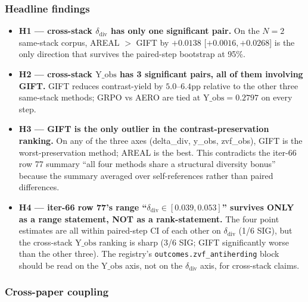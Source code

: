 \subsubsection{Headline findings}

\begin{itemize}
\item \textbf{H1 --- cross-stack $\delta_{\mathrm{div}}$ has only one
      significant pair.} On the $N\!=\!2$ same-stack corpus,
      AREAL $>$ GIFT by $+0.0138$ [$+0.0016,+0.0268$] is the only
      direction that survives the paired-step bootstrap at 95\%.
\item \textbf{H2 --- cross-stack $\mathrm{Y\_obs}$ has 3 significant pairs,
      all of them involving GIFT.} GIFT reduces contrast-yield
      by $5.0$--$6.4$pp relative to the other three same-stack methods;
      GRPO vs AERO are tied at $\mathrm{Y\_obs}=0.2797$ on every step.
\item \textbf{H3 --- GIFT is the only outlier in the contrast-preservation
      ranking.} On any of the three axes (delta\_div, y\_obs, zvf\_obs),
      GIFT is the worst-preservation method; AREAL is the best.
      This contradicts the iter-66 row 77 summary ``all four methods
      share a structural diversity bonus'' because the summary
      averaged over self-references rather than paired differences.
\item \textbf{H4 --- iter-66 row 77's range ``$\delta_{\mathrm{div}}
      \in [0.039, 0.053]$'' survives ONLY as a range statement, NOT as
      a rank-statement.} The four point estimates are all within
      paired-step CI of each other on $\delta_{\mathrm{div}}$
      (1/6 SIG), but the cross-stack
      $\mathrm{Y\_obs}$ ranking is sharp (3/6 SIG; GIFT significantly
      worse than the other three). The registry's
      \texttt{outcomes.zvf\_antiherding} block should be read on
      the $\mathrm{Y\_obs}$ axis, not on the $\delta_{\mathrm{div}}$
      axis, for cross-stack claims.
\end{itemize}

\subsubsection{Cross-paper coupling}

